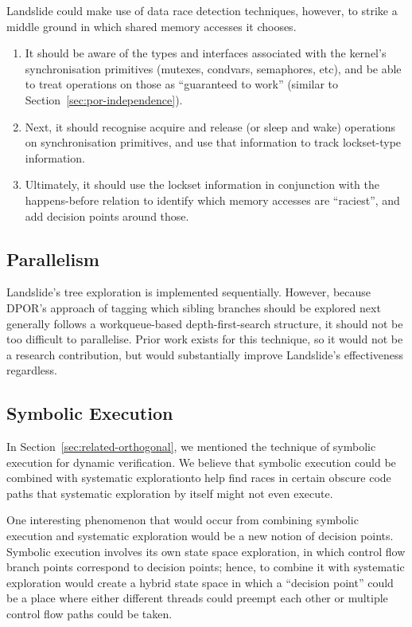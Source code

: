 Landslide could make use of data race detection techniques\cite{datacollider}, however, to strike a middle ground in which shared memory accesses it chooses.
\begin{enumerate}
	\item It should be aware of the types and interfaces associated with the kernel's synchronisation primitives (mutexes, condvars, semaphores, etc), and be able to treat operations on those as ``guaranteed to work'' (similar to Section~\ref{sec:por-independence}).
	\item Next, it should recognise acquire and release (or sleep and wake) operations on synchronisation primitives, and use that information to track lockset-type information.
	\item Ultimately, it should use the lockset information in conjunction with the happens-before relation to identify which memory accesses are ``raciest'', and add decision points around those.
\end{enumerate}

\subsection{Parallelism}

Landslide's tree exploration is implemented sequentially. However, because DPOR's approach of tagging which sibling branches should be explored next generally follows a workqueue-based depth-first-search structure, it should not be too difficult to parallelise. Prior work exists for this technique\cite{distributed-dpor}, so it would not be a research contribution, but would substantially improve Landslide's effectiveness regardless.

\subsection{Symbolic Execution}

In Section~\ref{sec:related-orthogonal}, we mentioned the technique of symbolic execution for dynamic verification. We believe that symbolic execution could be combined with systematic explorationto help find races in certain obscure code paths that systematic exploration by itself might not even execute.

One interesting phenomenon that would occur from combining symbolic execution and systematic exploration would be a new notion of decision points. Symbolic execution involves its own state space exploration, in which control flow branch points correspond to decision points; hence, to combine it with systematic exploration would create a hybrid state space in which a ``decision point'' could be a place where either different threads could preempt each other or multiple control flow paths could be taken\cite{dawson}.


